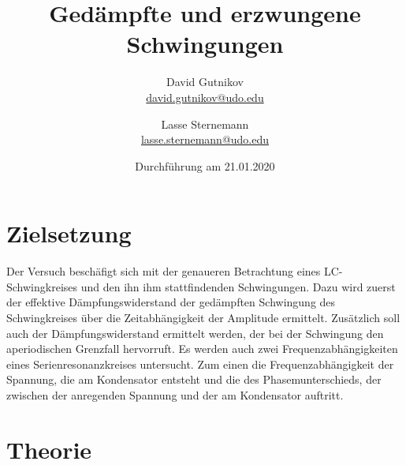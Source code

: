 \documentclass[titlepage = firstcover]{scrartcl}
\title{Gedämpfte und erzwungene Schwingungen}
\author{
  David Gutnikov\\
  \href{mailto:david.gutnikov@udo.edu}{david.gutnikov@udo.edu}
 \and 
  Lasse Sternemann\\
  \href{mailto:lasse.sternemann@udo.edu}{lasse.sternemann@udo.edu}
}
\date{Durchführung am 21.01.2020}
\begin{document}
    \maketitle
    \newpage
    \tableofcontents
    \newpage

    \section{Zielsetzung}
        Der Versuch beschäfigt sich mit der genaueren Betrachtung eines LC-Schwingkreises und den ihn ihm stattfindenden Schwingungen. Dazu wird zuerst der 
        effektive Dämpfungswiderstand der gedämpften Schwingung des Schwingkreises über die Zeitabhängigkeit der Amplitude ermittelt. Zusätzlich soll auch der
        Dämpfungswiderstand ermittelt werden, der bei der Schwingung den aperiodischen Grenzfall hervorruft. Es werden auch zwei Frequenzabhängigkeiten eines 
        Serienresonanzkreises untersucht. Zum einen die Frequenzabhängigkeit der Spannung, die am Kondensator entsteht und die des Phasemunterschieds, der 
        zwischen der anregenden Spannung und der am Kondensator auftritt.
        
    \section{Theorie}
\end{document}

